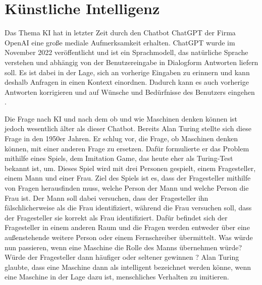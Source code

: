 \section{Künstliche Intelligenz}
\label{chap:KI}

Das Thema \ac{KI} hat in letzter Zeit durch den Chatbot ChatGPT der Firma OpenAI eine große mediale Aufmerksamkeit erhalten. 
ChatGPT wurde im November 2022 veröffentlicht und ist ein Sprachmodell, das natürliche Sprache verstehen und abhängig von der 
Benutzereingabe in Dialogform Antworten liefern soll. Es ist dabei in der Lage, sich an vorherige Eingaben zu erinnern und kann 
deshalb Anfragen in einen Kontext einordnen. Dadurch kann es auch vorherige Antworten korrigieren und auf Wünsche und Bedürfnisse 
des Benutzers eingehen \cite[]{CHATGPT}. 

Die Frage nach \ac{KI} und nach dem ob und wie Maschinen denken können ist jedoch wesentlich älter als dieser Chatbot. 
Bereits Alan Turing stellte sich diese Frage in den 1950er Jahren. Er schlug vor, die Frage, ob Maschinen denken können,
mit einer anderen Frage zu ersetzen. Dafür formulierte er das Problem mithilfe eines Spiels, dem \glqq Imitation Game\grqq{}, 
das heute eher als Turing-Test bekannt ist, um. Dieses Spiel wird mit drei Personen gespielt, einem Fragesteller, einem Mann und 
einer Frau. Ziel des Spiels ist es, dass der Fragesteller mithilfe von Fragen herausfinden muss, welche Person der Mann und welche Person 
die Frau ist. Der Mann soll dabei versuchen, dass der Fragesteller ihn fälschlicherweise als die Frau identifiziert, während die Frau versuchen soll, 
dass der Fragesteller sie korrekt als Frau identifiziert. Dafür befindet sich der Fragesteller in einem anderen Raum und die Fragen werden entweder 
über eine außenstehende weitere Person oder einem Fernschreiber übermittelt. Was würde nun passieren, wenn eine Maschine die Rolle des Manns übernehmen würde?
Würde der Fragesteller dann häufiger oder seltener gewinnen \cite[vgl. S.433f.]{TURING}? Alan Turing glaubte, dass eine Maschine dann als
intelligent bezeichnet werden könne, wenn eine Maschine in der Lage dazu ist, menschliches Verhalten zu imitieren.

